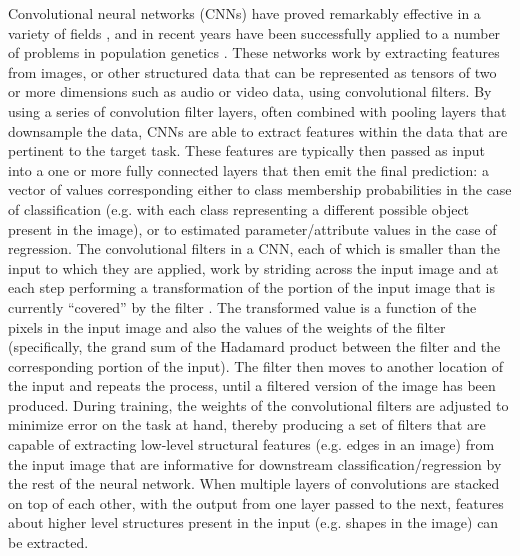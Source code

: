 Convolutional neural networks (CNNs) have proved remarkably effective in a variety of fields \cite{erhanScalableObjectDetection2013,hochreiterLongShortTermMemory1997,lecunGradientbasedLearningApplied1998,guRecentAdvancesConvolutional2018,liSurveyConvolutionalNeural2022}, and in recent years have been successfully applied to a number of problems in population genetics \cite{korfmannDeepLearningPopulation2023a,schriderSupervisedMachineLearning2018,sheehanDeepLearningPopulation2016}. These networks work by extracting features from images, or other structured data that can be represented as tensors of two or more dimensions such as audio or video data, using convolutional filters. By using a series of convolution filter layers, often combined with pooling layers that downsample the data, CNNs are able to extract features within the data that are pertinent to the target task. These features are typically then passed as input into a one or more fully connected layers that then emit the final prediction: a vector of values corresponding either to class membership probabilities in the case of classification (e.g. with each class representing a different possible object present in the image), or to estimated parameter/attribute values in the case of regression. The convolutional filters in a CNN, each of which is smaller than the input to which they are applied, work by striding across the input image and at each step performing a transformation of the portion of the input image that is currently “covered” by the filter \cite{lecunBackpropagationAppliedHandwritten1989}. The transformed value is a function of the pixels in the input image and also the values of the weights of the filter (specifically, the grand sum of the Hadamard product between the filter and the corresponding portion of the input). The filter then moves to another location of the input and repeats the process, until a filtered version of the image has been produced. During training, the weights of the convolutional filters are adjusted to minimize error on the task at hand, thereby producing a set of filters that are capable of extracting low-level structural features (e.g. edges in an image) from the input image that are informative for downstream classification/regression by the rest of the neural network. When multiple layers of convolutions are stacked on top of each other, with the output from one layer passed to the next, features about higher level structures present in the input (e.g. shapes in the image) can be extracted.

